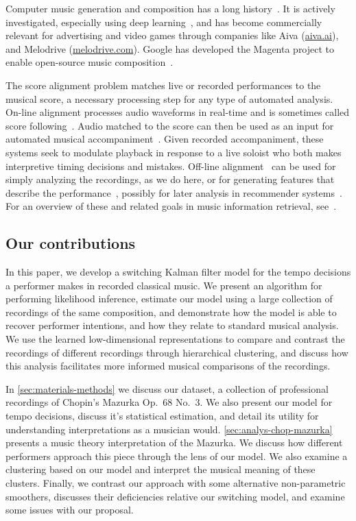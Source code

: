 \documentclass[12pt]{article}
\begin{document}
Computer music generation and composition has a long
history~\citep{SturmBen-Tal2019,Boulanger-LewandowskiBengio2012,Collins2016,Ariza2005,FlossmannGrachten2013}.
It is actively investigated, especially using deep
learning~\citep{HadjeresPachet2017}, and has become commercially
relevant for advertising and video games through companies like
Aiva (\url{aiva.ai}), and Melodrive (\url{melodrive.com}). Google has
developed the Magenta project to enable open-source music
composition~\citep{RobertsHawthorne2018}.

The score alignment
problem matches live or recorded performances to the musical score, a necessary
processing step for any type of automated analysis. On-line alignment processes
audio waveforms in real-time 
and is sometimes called score
following~\citep{DannenbergRaphael2006,Cont2010,ContSchwarz2007,ArztWidmer2015}. Audio
matched to the score can then be used as an input for automated
musical accompaniment~\citep{Raphael2010,Vercoe1985,Dannenberg1985}.
Given recorded accompaniment, these systems seek to
modulate playback in response to a live soloist who both makes
interpretive timing decisions and mistakes. Off-line alignment~\citep{Earis2007} can be
used for simply analyzing the recordings, as we do here, or for
generating features that describe the
performance~\citep{ThickstunHarchaoui2017}, possibly for later analysis
in recommender
systems~\citep{McFeeLanckriet2011,OordDieleman2013}. For an overview
of these and related goals in music information retrieval, see~\citet{schedl2014music}.

\subsection{Our contributions}
\label{sec:our-contributions}

In this paper, we develop a switching Kalman filter model for the
tempo decisions a performer makes in recorded classical music. We
present an algorithm for performing likelihood inference, estimate our
model using a large collection of recordings of the same composition,
and demonstrate how the model is able to recover performer intentions,
and how they relate to standard musical analysis. We use the learned
low-dimensional representations to compare and contrast the recordings
of different recordings through hierarchical clustering, and 
discuss how this analysis facilitates more informed musical
comparisons of the recordings.

In \autoref{sec:materials-methods} we discuss our dataset, a
collection of professional recordings of Chopin's Mazurka Op.\ 68 No.\
3. We also present our model for tempo decisions, discuss it's
statistical estimation, and detail its utility for understanding
interpretations as a musician would. \autoref{sec:analys-chop-mazurka}
presents a music theory interpretation of the Mazurka. We discuss how
different performers approach this piece through the lens of our model.
We also examine a clustering based on our model and interpret the musical
meaning of these clusters.  Finally, we contrast our approach with
some alternative non-parametric
smoothers, discusses their deficiencies relative our switching model,
and examine some issues with our proposal.
\end{document}
